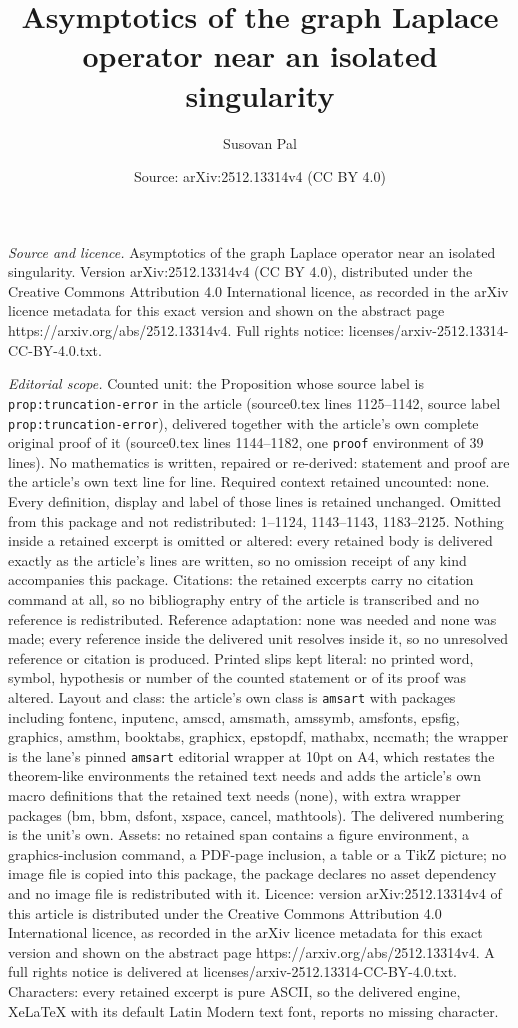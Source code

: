 \documentclass[10pt,a4paper]{amsart}
\title[Asymptotics of the graph Laplace operator near an isolated s]{Asymptotics of the graph Laplace operator near an isolated singularity}
\author{Susovan Pal}
\date{Source: arXiv:2512.13314v4 (CC BY 4.0)}
\begin{document}
\maketitle

\noindent\emph{Source and licence.} Asymptotics of the graph Laplace operator near an isolated singularity. Version arXiv:2512.13314v4 (CC BY 4.0), distributed under the Creative Commons Attribution 4.0 International licence, as recorded in the arXiv licence metadata for this exact version and shown on the abstract page https://arxiv.org/abs/2512.13314v4. Full rights notice: licenses/arxiv-2512.13314-CC-BY-4.0.txt.\par\smallskip

\noindent\textit{Editorial scope.} Counted unit: the Proposition whose source label is \texttt{prop:truncation-error} in the article (source0.tex lines 1125--1142, source label \texttt{prop:truncation-error}), delivered together with the article's own complete original proof of it (source0.tex lines 1144--1182, one \texttt{proof} environment of 39 lines). No mathematics is written, repaired or re-derived: statement and proof are the article's own text line for line. Required context retained uncounted: none. Every definition, display and label of those lines is retained unchanged. Omitted from this package and not redistributed: 1--1124, 1143--1143, 1183--2125. Nothing inside a retained excerpt is omitted or altered: every retained body is delivered exactly as the article's lines are written, so no omission receipt of any kind accompanies this package. Citations: the retained excerpts carry no citation command at all, so no bibliography entry of the article is transcribed and no reference is redistributed. Reference adaptation: none was needed and none was made; every reference inside the delivered unit resolves inside it, so no unresolved reference or citation is produced. Printed slips kept literal: no printed word, symbol, hypothesis or number of the counted statement or of its proof was altered. Layout and class: the article's own class is \texttt{amsart} with packages including fontenc, inputenc, amscd, amsmath, amssymb, amsfonts, epsfig, graphics, amsthm, booktabs, graphicx, epstopdf, mathabx, nccmath; the wrapper is the lane's pinned \texttt{amsart} editorial wrapper at 10pt on A4, which restates the theorem-like environments the retained text needs and adds the article's own macro definitions that the retained text needs (none), with extra wrapper packages (bm, bbm, dsfont, xspace, cancel, mathtools). The delivered numbering is the unit's own. Assets: no retained span contains a figure environment, a graphics-inclusion command, a PDF-page inclusion, a table or a TikZ picture; no image file is copied into this package, the package declares no asset dependency and no image file is redistributed with it. Licence: version arXiv:2512.13314v4 of this article is distributed under the Creative Commons Attribution 4.0 International licence, as recorded in the arXiv licence metadata for this exact version and shown on the abstract page https://arxiv.org/abs/2512.13314v4. A full rights notice is delivered at licenses/arxiv-2512.13314-CC-BY-4.0.txt. Characters: every retained excerpt is pure ASCII, so the delivered engine, XeLaTeX with its default Latin Modern text font, reports no missing character.
\end{document}
